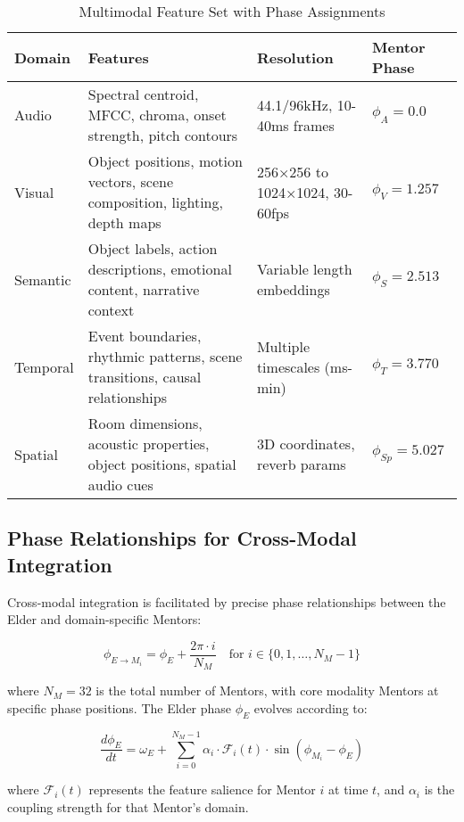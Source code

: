 \begin{table}[h]
\centering
\small
\begin{tabular}{|l|p{5.5cm}|l|l|}
\hline
\textbf{Domain} & \textbf{Features} & \textbf{Resolution} & \textbf{Mentor Phase} \\
\hline
Audio & Spectral centroid, MFCC, chroma, onset strength, pitch contours & 44.1/96kHz, 10-40ms frames & $\phi_A = 0.0$ \\
\hline
Visual & Object positions, motion vectors, scene composition, lighting, depth maps & 256×256 to 1024×1024, 30-60fps & $\phi_V = 1.257$ \\
\hline
Semantic & Object labels, action descriptions, emotional content, narrative context & Variable length embeddings & $\phi_S = 2.513$ \\
\hline
Temporal & Event boundaries, rhythmic patterns, scene transitions, causal relationships & Multiple timescales (ms-min) & $\phi_T = 3.770$ \\
\hline
Spatial & Room dimensions, acoustic properties, object positions, spatial audio cues & 3D coordinates, reverb params & $\phi_{Sp} = 5.027$ \\
\hline
\end{tabular}
\caption{Multimodal Feature Set with Phase Assignments}
\end{table}

\subsection{Phase Relationships for Cross-Modal Integration}

Cross-modal integration is facilitated by precise phase relationships between the Elder and domain-specific Mentors:

\begin{equation}
\phi_{E \to M_i} = \phi_E + \frac{2\pi \cdot i}{N_M} \quad \text{for } i \in \{0,1,\ldots,N_M-1\}
\end{equation}

where $N_M = 32$ is the total number of Mentors, with core modality Mentors at specific phase positions. The Elder phase $\phi_E$ evolves according to:

\begin{equation}
\frac{d\phi_E}{dt} = \omega_E + \sum_{i=0}^{N_M-1} \alpha_i \cdot \mathcal{F}_i(t) \cdot \sin(\phi_{M_i} - \phi_E)
\end{equation}

where $\mathcal{F}_i(t)$ represents the feature salience for Mentor $i$ at time $t$, and $\alpha_i$ is the coupling strength for that Mentor's domain.

